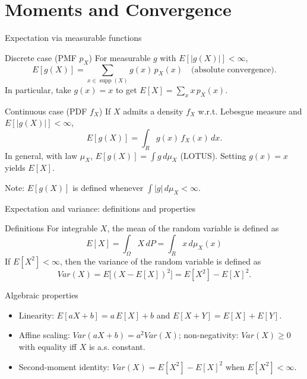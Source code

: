 \documentclass[aspectratio=43]{beamer}
\def\P{P}%
\def\E{E}%
\def\Var{Var}%
\def\mathbb#1{#1}%
\newcommand{\R}{\mathbb{R}}
\renewcommand{\P}{\mathbb{P}}
\newcommand{\E}{\mathbb{E}}
\newcommand{\Var}{\operatorname{Var}}
\newcommand{\1}{\mathbf{1}}
\begin{document}
\section{Moments and Convergence}

\begin{frame}{Expectation via measurable functions}{}
  {\small
  \begin{block}{Discrete case (PMF $p_X$)}
    For measurable $g$ with $\E[|g(X)|]<\infty$,
    \[ \E[g(X)] = \sum_{x\in\operatorname{supp}(X)} g(x)\,p_X(x) \quad \text{(absolute convergence).} \]
    In particular, take $g(x)=x$ to get $\E[X]=\sum_x x\,p_X(x)$.
  \end{block}
  \begin{block}{Continuous case (PDF $f_X$)}
    If $X$ admits a density $f_X$ w.r.t. Lebesgue measure and $\E[|g(X)|]<\infty$,
    \[ \E[g(X)] = \int_{\R} g(x)\, f_X(x)\, dx. \]
    In general, with law $\mu_X$, $\E[g(X)]=\int g\,d\mu_X$ (LOTUS). Setting $g(x)=x$ yields $\E[X]$.
  \end{block}
  }
  {\scriptsize Note: $\E[g(X)]$ is defined whenever $\int |g|\,d\mu_X<\infty$.}
\end{frame}

\begin{frame}{Expectation and variance: definitions and properties}
  \begin{block}{Definitions}
    For integrable $X$, the mean of the random variable is defined as
    \[ \E[X]=\int_\Omega X\,d\P=\int_{\R} x\,d\mu_X(x) \]
    If $\E[X^2]<\infty$, then the variance of the random variable is defined as
    \[ \Var(X)=\E\big[(X-\E[X])^2\big] = \E[X^2]-\E[X]^2. \]
  \end{block}
  \begin{alertblock}{Algebraic properties}
    \begin{itemize}
      \item Linearity: $\E[aX+b]=a\,\E[X]+b$ and $\E[X+Y]=\E[X]+\E[Y]$.
      \item Affine scaling: $\Var(aX+b)=a^2\Var(X)$; non-negativity: $\Var(X)\ge 0$ with equality iff $X$ is a.s. constant.
      \item Second-moment identity: $\Var(X)=\E[X^2]-\E[X]^2$ when $\E[X^2]<\infty$.
    \end{itemize}
  \end{alertblock}
\end{frame}
\end{document}
